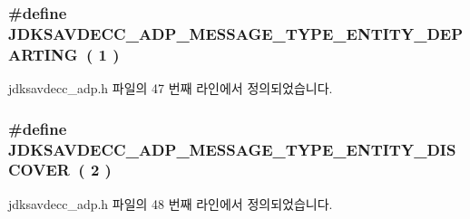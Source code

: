 \subsubsection[{\texorpdfstring{J\+D\+K\+S\+A\+V\+D\+E\+C\+C\+\_\+\+A\+D\+P\+\_\+\+M\+E\+S\+S\+A\+G\+E\+\_\+\+T\+Y\+P\+E\+\_\+\+E\+N\+T\+I\+T\+Y\+\_\+\+D\+E\+P\+A\+R\+T\+I\+NG}{JDKSAVDECC_ADP_MESSAGE_TYPE_ENTITY_DEPARTING}}]{\setlength{\rightskip}{0pt plus 5cm}\#define J\+D\+K\+S\+A\+V\+D\+E\+C\+C\+\_\+\+A\+D\+P\+\_\+\+M\+E\+S\+S\+A\+G\+E\+\_\+\+T\+Y\+P\+E\+\_\+\+E\+N\+T\+I\+T\+Y\+\_\+\+D\+E\+P\+A\+R\+T\+I\+NG~( 1 )}\hypertarget{group__adpdu__msg_ga2c307c257b44926f0299f86c1b2dc94b}{}\label{group__adpdu__msg_ga2c307c257b44926f0299f86c1b2dc94b}


jdksavdecc\+\_\+adp.\+h 파일의 47 번째 라인에서 정의되었습니다.

\subsubsection[{\texorpdfstring{J\+D\+K\+S\+A\+V\+D\+E\+C\+C\+\_\+\+A\+D\+P\+\_\+\+M\+E\+S\+S\+A\+G\+E\+\_\+\+T\+Y\+P\+E\+\_\+\+E\+N\+T\+I\+T\+Y\+\_\+\+D\+I\+S\+C\+O\+V\+ER}{JDKSAVDECC_ADP_MESSAGE_TYPE_ENTITY_DISCOVER}}]{\setlength{\rightskip}{0pt plus 5cm}\#define J\+D\+K\+S\+A\+V\+D\+E\+C\+C\+\_\+\+A\+D\+P\+\_\+\+M\+E\+S\+S\+A\+G\+E\+\_\+\+T\+Y\+P\+E\+\_\+\+E\+N\+T\+I\+T\+Y\+\_\+\+D\+I\+S\+C\+O\+V\+ER~( 2 )}\hypertarget{group__adpdu__msg_ga71372df276c0ad5c2b62ba9cd8bcacbd}{}\label{group__adpdu__msg_ga71372df276c0ad5c2b62ba9cd8bcacbd}


jdksavdecc\+\_\+adp.\+h 파일의 48 번째 라인에서 정의되었습니다.

